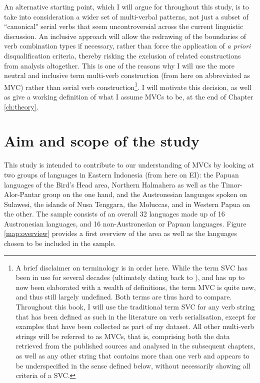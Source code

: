 An alternative starting point, which I will argue for throughout this study, is to take into consideration a wider set of multi-verbal patterns, not just a subset of ``canonical" serial verbs that seem uncontroversial across the current linguistic discussion. An inclusive approach will allow the redrawing of the boundaries of verb combination types if necessary, rather than force the application of \textit{a priori} disqualification criteria, thereby risking the exclusion of related constructions from analysis altogether. This is one of the reasons why I will use the more neutral and inclusive term multi-verb construction (from here on abbreviated as MVC) rather than serial verb construction\footnote{A brief disclaimer on terminology is in order here. While the term SVC has been in use for several decades (ultimately dating back to \citealt{christaller1875}), and has up to now been elaborated with a wealth of definitions, the term MVC is quite new, and thus still largely undefined. Both terms are thus hard to compare. Throughout this book, I will use the traditional term SVC for any verb string that has been defined as such in the literature on verb serialisation, except for examples that have been collected as part of my dataset. All other multi-verb strings will be referred to as MVCs, that is, comprising both the data retrieved from the published sources and analysed in the subsequent chapters, as well as any other string that contains more than one verb and appears to be underspecified in the sense defined below, without necessarily showing all criteria of a SVC.}. I will motivate this decision, as well as give a working definition of what I assume MVCs to be, at the end of Chapter \ref{ch:theory}.

\section{Aim and scope of the study}

This study is intended to contribute to our understanding of MVCs by looking at two groups of languages in Eastern Indonesia (from here on EI): the Papuan languages of the Bird's Head area, Northern Halmahera as well as the Timor-Alor-Pantar group on the one hand, and the Austronesian languages spoken on Sulawesi, the islands of Nusa Tenggara, the Moluccas, and in Western Papua on the other. The sample consists of an overall 32 languages made up of 16 Austronesian languages, and 16 non-Austronesian or Papuan languages. Figure \ref{map:overview} provides a first overview of the area as well as the languages chosen to be included in the sample.

